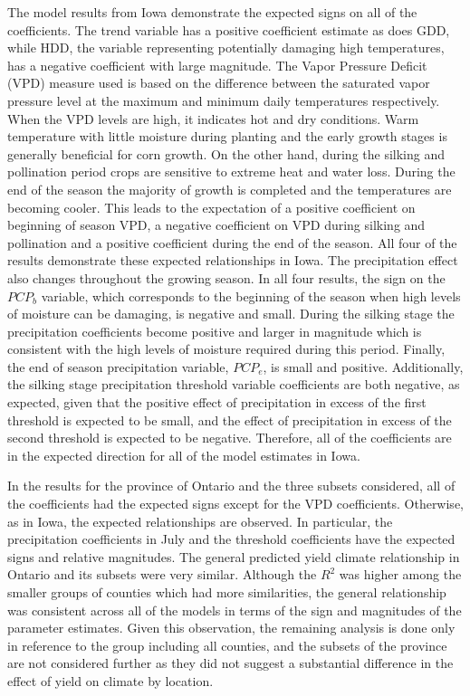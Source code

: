 The model results from Iowa demonstrate the expected signs on all of the coefficients. The trend variable has a positive coefficient estimate as does GDD, while HDD, the variable representing potentially damaging high temperatures, has a negative coefficient with large magnitude. The Vapor Pressure Deficit (VPD) measure used is based on the difference between the saturated vapor pressure level at the maximum and minimum daily temperatures respectively. When the VPD levels are high, it indicates hot and dry conditions. Warm temperature with little moisture during planting and the early growth stages is generally beneficial for corn growth.  On the other hand, during the silking and pollination period crops are sensitive to extreme heat and water loss. During the end of the season the majority of growth is completed and the temperatures are becoming cooler. This leads to the expectation of a positive coefficient on beginning of season VPD, a negative coefficient on VPD during silking and pollination and a positive coefficient during the end of the season. All four of the results demonstrate these expected relationships in Iowa. The precipitation effect also changes throughout the growing season. In all four results, the sign on the $PCP_b$ variable, which corresponds to the beginning of the season when high levels of moisture can be damaging, is negative and small. During the silking stage the precipitation coefficients become positive and larger in magnitude which is consistent with the high levels of moisture required during this period. Finally, the end of season precipitation variable, $PCP_e$, is small and positive. Additionally, the silking stage precipitation threshold variable coefficients are both negative, as expected, given that the positive effect of precipitation in excess of the first threshold is expected to be small, and the effect of precipitation in excess of the second threshold is expected to be negative. Therefore, all of the coefficients are in the expected direction for all of the model estimates in Iowa. 

In the results for the province of Ontario and the three subsets considered, all of the coefficients had the expected signs except for the VPD coefficients. Otherwise, as in Iowa, the expected relationships are observed. In particular, the precipitation coefficients in July and the threshold coefficients have the expected signs and relative magnitudes. The general predicted yield climate relationship in Ontario and its subsets were very similar. Although the $R^2$ was higher among the smaller groups of counties which had more similarities, the general relationship was consistent across all of the models in terms of the sign and magnitudes of the parameter estimates. Given this observation, the remaining analysis is done only in reference to the group including all counties, and the subsets of the province are not considered further as they did not suggest a substantial difference in the effect of yield on climate by location.

